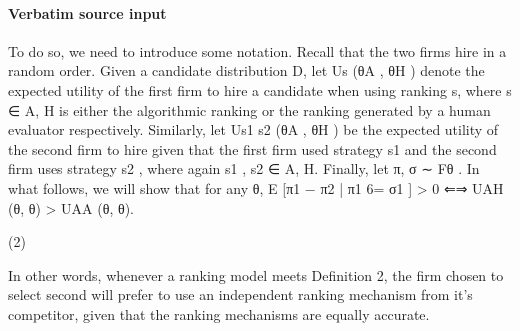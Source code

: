 \documentclass[10pt]{article}
\begin{document}
\paragraph{Verbatim source input}
\begin{ReviewVerbatim}
To do so, we need to introduce some notation. Recall that the two firms hire in a random order. Given
a candidate distribution D, let Us (θA , θH ) denote the expected utility of the first firm to hire a candidate
when using ranking s, where s ∈ {A, H} is either the algorithmic ranking or the ranking generated by a
human evaluator respectively. Similarly, let Us1 s2 (θA , θH ) be the expected utility of the second firm to hire
given that the first firm used strategy s1 and the second firm uses strategy s2 , where again s1 , s2 ∈ {A, H}.
Finally, let π, σ ∼ Fθ .
In what follows, we will show that for any θ,
E [π1 − π2 | π1 6= σ1 ] > 0 ⇐⇒ UAH (θ, θ) > UAA (θ, θ).

(2)

In other words, whenever a ranking model meets Definition 2, the firm chosen to select second will prefer to
use an independent ranking mechanism from it’s competitor, given that the ranking mechanisms are equally
accurate.
\end{ReviewVerbatim}
\end{document}
